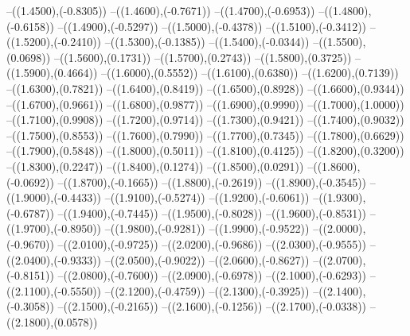 {	--({\sx*(1.4500)},{\sy*(-0.8305)})
	--({\sx*(1.4600)},{\sy*(-0.7671)})
	--({\sx*(1.4700)},{\sy*(-0.6953)})
	--({\sx*(1.4800)},{\sy*(-0.6158)})
	--({\sx*(1.4900)},{\sy*(-0.5297)})
	--({\sx*(1.5000)},{\sy*(-0.4378)})
	--({\sx*(1.5100)},{\sy*(-0.3412)})
	--({\sx*(1.5200)},{\sy*(-0.2410)})
	--({\sx*(1.5300)},{\sy*(-0.1385)})
	--({\sx*(1.5400)},{\sy*(-0.0344)})
	--({\sx*(1.5500)},{\sy*(0.0698)})
	--({\sx*(1.5600)},{\sy*(0.1731)})
	--({\sx*(1.5700)},{\sy*(0.2743)})
	--({\sx*(1.5800)},{\sy*(0.3725)})
	--({\sx*(1.5900)},{\sy*(0.4664)})
	--({\sx*(1.6000)},{\sy*(0.5552)})
	--({\sx*(1.6100)},{\sy*(0.6380)})
	--({\sx*(1.6200)},{\sy*(0.7139)})
	--({\sx*(1.6300)},{\sy*(0.7821)})
	--({\sx*(1.6400)},{\sy*(0.8419)})
	--({\sx*(1.6500)},{\sy*(0.8928)})
	--({\sx*(1.6600)},{\sy*(0.9344)})
	--({\sx*(1.6700)},{\sy*(0.9661)})
	--({\sx*(1.6800)},{\sy*(0.9877)})
	--({\sx*(1.6900)},{\sy*(0.9990)})
	--({\sx*(1.7000)},{\sy*(1.0000)})
	--({\sx*(1.7100)},{\sy*(0.9908)})
	--({\sx*(1.7200)},{\sy*(0.9714)})
	--({\sx*(1.7300)},{\sy*(0.9421)})
	--({\sx*(1.7400)},{\sy*(0.9032)})
	--({\sx*(1.7500)},{\sy*(0.8553)})
	--({\sx*(1.7600)},{\sy*(0.7990)})
	--({\sx*(1.7700)},{\sy*(0.7345)})
	--({\sx*(1.7800)},{\sy*(0.6629)})
	--({\sx*(1.7900)},{\sy*(0.5848)})
	--({\sx*(1.8000)},{\sy*(0.5011)})
	--({\sx*(1.8100)},{\sy*(0.4125)})
	--({\sx*(1.8200)},{\sy*(0.3200)})
	--({\sx*(1.8300)},{\sy*(0.2247)})
	--({\sx*(1.8400)},{\sy*(0.1274)})
	--({\sx*(1.8500)},{\sy*(0.0291)})
	--({\sx*(1.8600)},{\sy*(-0.0692)})
	--({\sx*(1.8700)},{\sy*(-0.1665)})
	--({\sx*(1.8800)},{\sy*(-0.2619)})
	--({\sx*(1.8900)},{\sy*(-0.3545)})
	--({\sx*(1.9000)},{\sy*(-0.4433)})
	--({\sx*(1.9100)},{\sy*(-0.5274)})
	--({\sx*(1.9200)},{\sy*(-0.6061)})
	--({\sx*(1.9300)},{\sy*(-0.6787)})
	--({\sx*(1.9400)},{\sy*(-0.7445)})
	--({\sx*(1.9500)},{\sy*(-0.8028)})
	--({\sx*(1.9600)},{\sy*(-0.8531)})
	--({\sx*(1.9700)},{\sy*(-0.8950)})
	--({\sx*(1.9800)},{\sy*(-0.9281)})
	--({\sx*(1.9900)},{\sy*(-0.9522)})
	--({\sx*(2.0000)},{\sy*(-0.9670)})
	--({\sx*(2.0100)},{\sy*(-0.9725)})
	--({\sx*(2.0200)},{\sy*(-0.9686)})
	--({\sx*(2.0300)},{\sy*(-0.9555)})
	--({\sx*(2.0400)},{\sy*(-0.9333)})
	--({\sx*(2.0500)},{\sy*(-0.9022)})
	--({\sx*(2.0600)},{\sy*(-0.8627)})
	--({\sx*(2.0700)},{\sy*(-0.8151)})
	--({\sx*(2.0800)},{\sy*(-0.7600)})
	--({\sx*(2.0900)},{\sy*(-0.6978)})
	--({\sx*(2.1000)},{\sy*(-0.6293)})
	--({\sx*(2.1100)},{\sy*(-0.5550)})
	--({\sx*(2.1200)},{\sy*(-0.4759)})
	--({\sx*(2.1300)},{\sy*(-0.3925)})
	--({\sx*(2.1400)},{\sy*(-0.3058)})
	--({\sx*(2.1500)},{\sy*(-0.2165)})
	--({\sx*(2.1600)},{\sy*(-0.1256)})
	--({\sx*(2.1700)},{\sy*(-0.0338)})
	--({\sx*(2.1800)},{\sy*(0.0578)})
}
